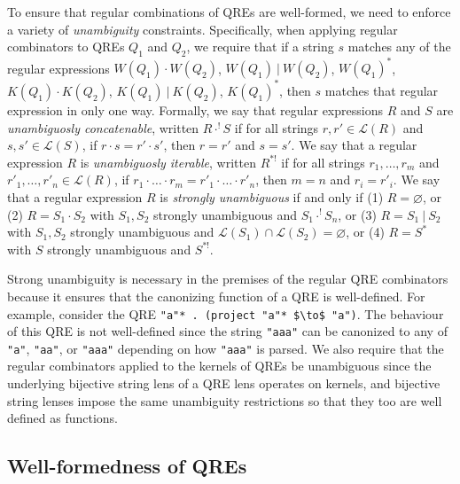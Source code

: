 \documentclass[acmsmall,review,anonymous]{acmart}
\newcommand{\sep}{\ensuremath{\ | \ }}
\newcommand{\cd}[1]{\lstinline[backgroundcolor=\color{white}]$#1$}
\begin{document}
To ensure that regular combinations of QREs are well-formed, we need
to enforce a variety of {\em unambiguity} constraints.  
Specifically, when applying regular combinators to QREs $Q_1$ and $Q_2$, we require that
if a string $s$ matches any of the regular expressions $W(Q_1) \cdot W(Q_2)$,
\quad $W(Q_1) \sep W(Q_2)$, \quad $W(Q_1)^*$, \quad $K(Q_1) \cdot K(Q_2)$,
\quad $K(Q_1) \sep K(Q_2)$, \quad $K(Q_1)^*$, then $s$ matches that regular
expression in only one way.
Formally, we say that regular expressions $R$ and $S$ are
\textit{unambiguosly concatenable}, written $R \cdot^! S$ if for all strings
$r, r' \in \mathcal{L}(R)$ and $s, s' \in \mathcal{L}(S)$, if $r \cdot s = r'
\cdot s'$, then $r = r'$ and $s = s'$. We say that a regular expression $R$ is
\textit{unambiguosly iterable}, written $R^{*!}$ if for all strings $r_1,
\ldots, r_m$ and $r'_1, \ldots, r'_n \in \mathcal{L}(R)$, if $r_1 \cdot \ldots
\cdot r_m = r'_1 \cdot \ldots \cdot r'_n$, then $m = n$ and $r_i = r'_i$. We say
that a regular expression $R$ is \textit{strongly unambiguous}\cite{Sippu1988}
if and only if (1) $R = \varnothing$, or (2) $R = S_1 \cdot S_2$ with $S_1,
S_2$ strongly unambiguous and $S_1 \cdot^! S_n$, or (3) $R = S_1 \sep S_2$ with
$S_1, S_2$ strongly unambiguous and $\mathcal{L}(S_1) \cap \mathcal{L}(S_2) =
\varnothing$, or (4) $R = S^*$ with $S$ strongly unambiguous and $S^{*!}$.

Strong unambiguity is necessary in the premises of the regular QRE combinators
because it ensures that the canonizing function of a QRE is well-defined.
For example, consider the QRE \lstinline{"a"* . (project "a"* $\to$ "a")}. The
behaviour of this QRE is not well-defined since the string
\cd{"aaa"} can be canonized to any of \cd{"a"}, \cd{"aa"}, or \cd{"aaa"}
depending on how \cd{"aaa"} is parsed. We also require that the regular
combinators applied to the kernels of QREs be unambiguous since the underlying
bijective string lens of a QRE lens operates on kernels, and bijective string lenses
impose the same unambiguity restrictions so that they too are well defined as
functions.

\subsection{Well-formedness of QREs}
\end{document}
